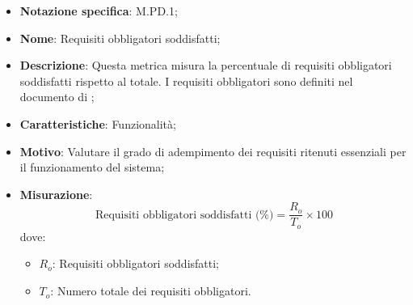 \begin{itemize}
    \item \textbf{Notazione specifica}: M.PD.1;
    \item \textbf{Nome}: Requisiti obbligatori soddisfatti;
    \item \textbf{Descrizione}: Questa metrica misura la percentuale di requisiti obbligatori soddisfatti rispetto al totale. I requisiti obbligatori sono definiti nel documento di \VersioneAR;
    \item \textbf{Caratteristiche}: Funzionalità;
    \item \textbf{Motivo}: Valutare il grado di adempimento dei requisiti ritenuti essenziali per il funzionamento del sistema;
    \item \textbf{Misurazione}:
    \[
    \text{Requisiti obbligatori soddisfatti (\%)} = \frac{R_{o}}{T_{o}} \times 100
    \]
    dove:
    \begin{itemize}
        \item $R_{o}$: Requisiti obbligatori soddisfatti;
        \item $T_{o}$: Numero totale dei requisiti obbligatori.
    \end{itemize}
\end{itemize}
